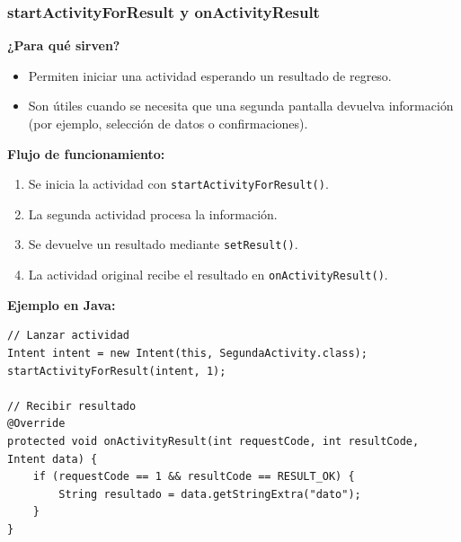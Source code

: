 
\begin{frame}[fragile]
\frametitle{startActivityForResult y onActivityResult}

\textbf{¿Para qué sirven?}

\begin{itemize}
    \item Permiten iniciar una actividad esperando un resultado de regreso.
    \item Son útiles cuando se necesita que una segunda pantalla devuelva información (por ejemplo, selección de datos o confirmaciones).
\end{itemize}

\textbf{Flujo de funcionamiento:}
\begin{enumerate}
    \item Se inicia la actividad con \texttt{startActivityForResult()}.
    \item La segunda actividad procesa la información.
    \item Se devuelve un resultado mediante \texttt{setResult()}.
    \item La actividad original recibe el resultado en \texttt{onActivityResult()}.
\end{enumerate}

\textbf{Ejemplo en Java:}

\begin{verbatim}
// Lanzar actividad
Intent intent = new Intent(this, SegundaActivity.class);
startActivityForResult(intent, 1);

// Recibir resultado
@Override
protected void onActivityResult(int requestCode, int resultCode, Intent data) {
    if (requestCode == 1 && resultCode == RESULT_OK) {
        String resultado = data.getStringExtra("dato");
    }
}
\end{verbatim}

\end{frame}


